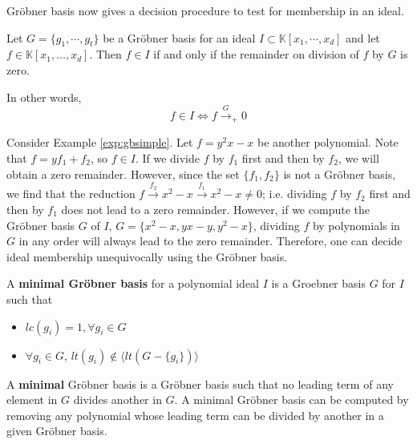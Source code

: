 Gr\"obner basis now gives a decision procedure to test for membership in an ideal.


    
\begin{Theorem}\label{the:membership}
	Let $G = \{g_1,\cdots,g_t \}$ be a Gr\"obner basis for an ideal $I \subset \mathbb{K}[x_1,\cdots,x_d ]$
	and let $f \in \mathbb{K}[x_{1},\dots, x_{d}]$. Then $f \in I$ if and only if the remainder on division of $f$ by
	$G$ is zero.
\end{Theorem}
In other words, 
\begin{equation}
f \in I \iff f \stackrel{G}{\textstyle\longrightarrow}_+0
\end{equation}



\begin{Example}
Consider Example \ref{exp:gbsimple}. Let $f = y^2x - x$ be another
polynomial. Note that $f = yf_1 + f_2$, so $f \in I$. If we divide $f$
by $f_1$ first and then by $f_2$, we will obtain a zero
remainder. However, since the set $\{f_1, f_2\}$ is not a Gr\"{o}bner
basis, we find that the reduction $f
\stackrel{f_2}{\textstyle\longrightarrow} x^2 - x
\stackrel{f_1}{\textstyle\longrightarrow} x^2 - x  \neq 0$;
i.e. dividing $f$ by $f_2$ first and then by $f_1$ does not lead to a
zero remainder. However,  if we compute the Gr\"{o}bner basis $G$ of
$I$, $G = \{x^2 - x, yx - y, y^2 - x\}$, dividing $f$ by polynomials
in $G$ in any order will always lead to the zero remainder. Therefore,
one can decide ideal membership unequivocally using the Gr\"{o}bner
basis. 
\end{Example}

\begin{Definition}\label{def:minigb}
A {\bf minimal Gr\"obner basis} for a polynomial ideal $I$ is a Groebner basis $G$ for $I$ such that
	\begin{itemize}
		\item $lc(g_{i})=1,\forall g_{i}\in G$
		\item $\forall g_{i} \in G$,  $lt(g_{i}) \notin \langle lt(G-\{g_{i}\})\rangle$
	\end{itemize}
\end{Definition}
A {\bf minimal} Gr\"obner basis is a Gr\"obner basis such that 
no leading term of any element in $G$ divides another in $G$.
A  minimal Gr\"obner basis can be computed by removing 
any polynomial whose leading term can be divided by another in a given Gr\"obner basis.
    
